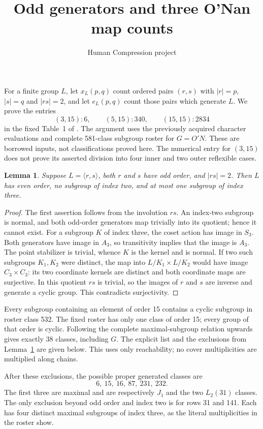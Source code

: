 \documentclass[11pt,a4paper]{article}
\title{Odd generators and three O'Nan map counts}
\author{Human Compression project}\date{}
\newtheorem{lemma}{Lemma}\newtheorem{proposition}[lemma]{Proposition}
\begin{document}
\maketitle
For a finite group $L$, let $x_L(p,q)$ count ordered pairs $(r,s)$
with $|r|=p$, $|s|=q$ and $|rs|=2$, and let $e_L(p,q)$ count those
pairs which generate $L$. We prove the entries
\[
 (3,15):6,\qquad (5,15):340,\qquad (15,15):2834
\]
in the fixed Table~1 of \cite{CL}. The argument uses the previously
acquired character evaluations and complete 581-class subgroup roster
for $G=O'N$. These are borrowed inputs, not classifications proved here.
The numerical entry for $(3,15)$ does not prove its asserted division
into four inner and two outer reflexible cases.

\begin{lemma}\label{odd}
Suppose $L=\langle r,s\rangle$, both $r$ and $s$ have odd order,
and $|rs|=2$. Then $L$ has even order, no subgroup of index two,
and at most one subgroup of index three.
\end{lemma}
\begin{proof}
The first assertion follows from the involution $rs$.
An index-two subgroup is normal, and both odd-order generators
map trivially into its quotient; hence it cannot exist.
For a subgroup $K$ of index three, the coset action has image in
$S_3$. Both generators have image in $A_3$, so transitivity implies
that the image is $A_3$. The point stabilizer is trivial, whence
$K$ is the kernel and is normal. If two such subgroups $K_1,K_2$
were distinct, the map into $L/K_1\times L/K_2$ would have image
$C_3\times C_3$: its two coordinate kernels are distinct and both
coordinate maps are surjective. In this quotient $rs$ is trivial,
so the images of $r$ and $s$ are inverse and generate a cyclic group.
This contradicts surjectivity.
\end{proof}

Every subgroup containing an element of order 15 contains a cyclic
subgroup in roster class 532. The fixed roster has only one class
of order 15; every group of that order is cyclic. Following the
complete maximal-subgroup relation upwards gives exactly 38 classes,
including $G$. The explicit list and the exclusions from Lemma~\ref{odd}
are given below. This uses only reachability; no cover multiplicities
are multiplied along chains.

After these exclusions, the possible proper generated classes are
\[
 6,\ 15,\ 16,\ 87,\ 231,\ 232.                 \tag{1}
\]
The first three are maximal and are respectively $J_1$ and the two
$L_2(31)$ classes. The only exclusion beyond odd order and index two
is for rows 31 and 141. Each has four distinct maximal subgroups of
index three, as the literal multiplicities in the roster show.
\end{document}
